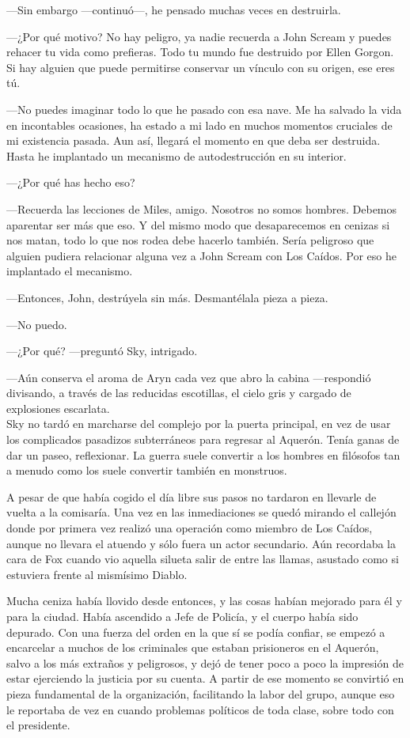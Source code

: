 ---Sin embargo ---continuó---, he pensado muchas veces en destruirla.

---¿Por qué motivo? No hay peligro, ya nadie recuerda a John Scream y puedes rehacer tu vida como prefieras. Todo tu mundo fue destruido por Ellen Gorgon. Si hay alguien que puede permitirse conservar un vínculo con su origen, ese eres tú.

---No puedes imaginar todo lo que he pasado con esa nave. Me ha salvado la vida en incontables ocasiones, ha estado a mi lado en muchos momentos cruciales de mi existencia pasada. Aun así, llegará el momento en que deba ser destruida. Hasta he implantado un mecanismo de autodestrucción en su interior.

---¿Por qué has hecho eso?

---Recuerda las lecciones de Miles, amigo. Nosotros no somos hombres. Debemos aparentar ser más que eso. Y del mismo modo que desaparecemos en cenizas si nos matan, todo lo que nos rodea debe hacerlo también. Sería peligroso que alguien pudiera relacionar alguna vez a John Scream con Los Caídos. Por eso he implantado el mecanismo.

---Entonces, John, destrúyela sin más. Desmantélala pieza a pieza.

---No puedo.

---¿Por qué? ---preguntó Sky, intrigado.

---Aún conserva el aroma de Aryn cada vez que abro la cabina ---respondió divisando, a través de las reducidas escotillas, el cielo gris y cargado de explosiones escarlata.\\

\noindent{}Sky no tardó en marcharse del complejo por la puerta principal, en vez de usar los complicados pasadizos subterráneos para regresar al Aquerón. Tenía ganas de dar un paseo, reflexionar. La guerra suele convertir a los hombres en filósofos tan a menudo como los suele convertir también en monstruos.

A pesar de que había cogido el día libre sus pasos no tardaron en llevarle de vuelta a la comisaría. Una vez en las inmediaciones se quedó mirando el callejón donde por primera vez realizó una operación como miembro de Los Caídos, aunque no llevara el atuendo y sólo fuera un actor secundario. Aún recordaba la cara de Fox cuando vio aquella silueta salir de entre las llamas, asustado como si estuviera frente al mismísimo Diablo.

Mucha ceniza había llovido desde entonces, y las cosas habían mejorado para él y para la ciudad. Había ascendido a Jefe de Policía, y el cuerpo había sido depurado. Con una fuerza del orden en la que sí se podía confiar, se empezó a encarcelar a muchos de los criminales que estaban prisioneros en el Aquerón, salvo a los más extraños y peligrosos, y dejó de tener poco a poco la impresión de estar ejerciendo la justicia por su cuenta. A partir de ese momento se convirtió en pieza fundamental de la organización, facilitando la labor del grupo, aunque eso le reportaba de vez en cuando problemas políticos de toda clase, sobre todo con el presidente.

